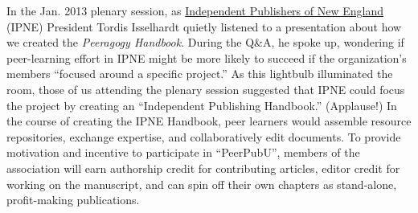 In the Jan. 2013 plenary session, as \href{http://IPNE.org}{Independent
Publishers of New England} (IPNE) President Tordis Isselhardt quietly
listened to a presentation about how we created the \emph{Peeragogy
Handbook}. During the Q\&A, he spoke up, wondering if peer-learning
effort in IPNE might be more likely to succeed if the organization's
members ``focused around a specific project.'' As this lightbulb
illuminated the room, those of us attending the plenary session
suggested that IPNE could focus the project by creating an ``Independent
Publishing Handbook.'' (Applause!) In the course of creating the IPNE
Handbook, peer learners would assemble resource repositories, exchange
expertise, and collaboratively edit documents. To provide motivation and
incentive to participate in ``PeerPubU'', members of the association
will earn authorship credit for contributing articles, editor credit for
working on the manuscript, and can spin off their own chapters as
stand-alone, profit-making publications.
